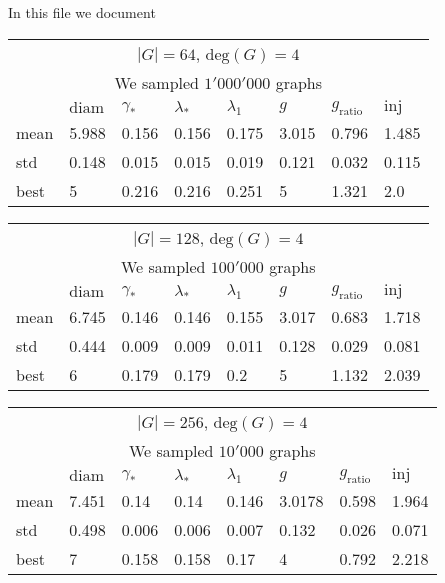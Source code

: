 In this file we document 

\begin{center}
	\begin{tabular}{ p{1cm}|p{1cm}|p{1cm}|p{1cm}|p{1cm}|p{1cm}|p{1cm}|p{1cm} }
		\multicolumn{8}{c}{$|G| = 64$, $\mathrm{deg}(G) = 4$} \\
		\multicolumn{8}{c}{We sampled $1'000'000$ graphs} \\
		 & $\mathrm{diam}$ & $\gamma_*$ & $\lambda_{*}$  &  $\lambda_1$ & $g$ & $g_{\mathrm{ratio}}$ & $\mathrm{inj}$     \\
		 \hline
		mean & 5.988 & 0.156 & 0.156 &  0.175 & 3.015 & 0.796 & 1.485 \\
		std & 0.148 & 0.015 & 0.015 &  0.019 & 0.121 & 0.032 & 0.115 \\
		best & 5 & 0.216 & 0.216 &  0.251 & 5 & 1.321 & 2.0 \\
	\end{tabular}
\end{center}

\vspace{1em}

\begin{center}
	\begin{tabular}{ p{1cm}|p{1cm}|p{1cm}|p{1cm}|p{1cm}|p{1cm}|p{1cm}|p{1cm} }
		\multicolumn{8}{c}{$|G| = 128$, $\mathrm{deg}(G) = 4$} \\
		\multicolumn{8}{c}{We sampled $100'000$ graphs} \\
		& $\mathrm{diam}$ & $\gamma_*$ & $\lambda_{*}$  &  $\lambda_1$ & $g$ & $g_{\mathrm{ratio}}$ & $\mathrm{inj}$     \\
		\hline
		mean & 6.745 & 0.146 & 0.146 &  0.155 & 3.017 & 0.683 & 1.718 \\
		std & 0.444 & 0.009 & 0.009 &  0.011 & 0.128 & 0.029 & 0.081 \\
		best & 6 & 0.179 & 0.179 &  0.2 & 5 & 1.132 & 2.039 \\
	\end{tabular}
\end{center}

\vspace{1em}

\begin{center}
	\begin{tabular}{ p{1cm}|p{1cm}|p{1cm}|p{1cm}|p{1cm}|p{1cm}|p{1cm}|p{1cm} }
		\multicolumn{8}{c}{$|G| = 256$, $\mathrm{deg}(G) = 4$} \\
		\multicolumn{8}{c}{We sampled $10'000$ graphs} \\
		& $\mathrm{diam}$ & $\gamma_*$ & $\lambda_{*}$  &  $\lambda_1$ & $g$ & $g_{\mathrm{ratio}}$ & $\mathrm{inj}$     \\
		\hline
		mean & 7.451 & 0.14 & 0.14 &  0.146 & 3.0178 & 0.598 & 1.964 \\
		std & 0.498 & 0.006 & 0.006 &  0.007 & 0.132 & 0.026 & 0.071 \\
		best & 7 & 0.158 & 0.158 &  0.17 & 4 & 0.792 & 2.218 \\
	\end{tabular}
\end{center}

